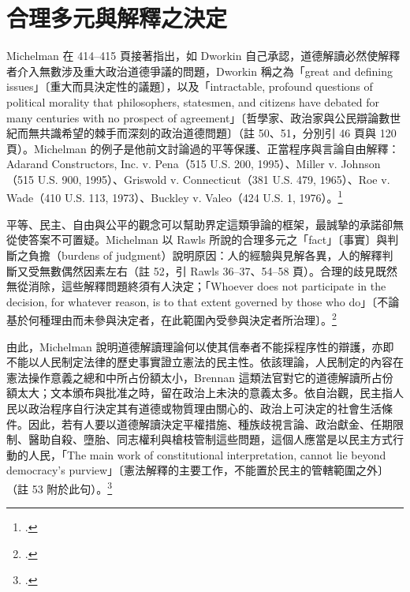 \section{合理多元與解釋之決定}
\label{sec:30_dworkin-4}

Michelman 在 414--415 頁接著指出，如 Dworkin 自己承認，道德解讀必然使解釋者介入無數涉及重大政治道德爭議的問題，Dworkin 稱之為「great and defining issues」〔重大而具決定性的議題〕，以及「intractable, profound questions of political morality that philosophers, statesmen, and citizens have debated for many centuries with no prospect of agreement」〔哲學家、政治家與公民辯論數世紀而無共識希望的棘手而深刻的政治道德問題〕（註 50、51，分別引  46 頁與  120 頁）。Michelman 的例子是他前文討論過的平等保護、正當程序與言論自由解釋：Adarand Constructors, Inc. v. Pena（515 U.S. 200, 1995）、Miller v. Johnson（515 U.S. 900, 1995）、Griswold v. Connecticut（381 U.S. 479, 1965）、Roe v. Wade（410 U.S. 113, 1973）、Buckley v. Valeo（424 U.S. 1, 1976）。\footcite[415 \& nn.3, 50--51]{michelman1998}

平等、民主、自由與公平的觀念可以幫助界定這類爭論的框架，最誠摯的承諾卻無從使答案不可置疑。Michelman 以 Rawls 所說的合理多元之「fact」〔事實〕與判斷之負擔（burdens of judgment）說明原因：人的經驗與見解各異，人的解釋判斷又受無數偶然因素左右（註 52，引 Rawls  36--37、54--58 頁）。合理的歧見既然無從消除，這些解釋問題終須有人決定；「Whoever does not participate in the decision, for whatever reason, is to that extent governed by those who do」〔不論基於何種理由而未參與決定者，在此範圍內受參與決定者所治理〕。\footcite[415 \& n.52]{michelman1998}

由此，Michelman 說明道德解讀理論何以使其信奉者不能採程序性的辯護，亦即不能以人民制定法律的歷史事實證立憲法的民主性。依該理論，人民制定的內容在憲法操作意義之總和中所占份額太小，Brennan 這類法官對它的道德解讀所占份額太大；文本頒布與批准之時，留在政治上未決的意義太多。依自治觀，民主指人民以政治程序自行決定其有道德或物質理由關心的、政治上可決定的社會生活條件。因此，若有人要以道德解讀決定平權措施、種族歧視言論、政治獻金、任期限制、醫助自殺、墮胎、同志權利與槍枝管制這些問題，這個人應當是以民主方式行動的人民，「The main work of constitutional interpretation, cannot lie beyond democracy's purview」〔憲法解釋的主要工作，不能置於民主的管轄範圍之外〕（註 53 附於此句）。\footcite[415]{michelman1998}

